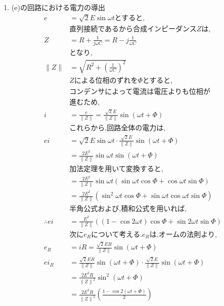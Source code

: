\documentclass[twocolumn]{article}
\begin{document}
\begin{enumerate}
    \item (e)の回路における電力の導出
    \begin{align*}
      e &= \sqrt{2}E\sin\omega t \text{とすると,}\\
      &\text{直列接続であるから合成インピーダンス}Z\text{は,}\\
      Z &= R + \frac{1}{j\omega C} = R -j\frac{1}{\omega C}\\
      &\text{となり,}\\
      \|Z\| &= \sqrt{R^2 + {\left( \frac{1}{\omega C} \right)}^2}\\
      &Z\text{による位相のずれを}\Phi\text{とすると,}\\
      &\text{コンデンサによって電流は電圧よりも位相が}\\
      &\text{進むため,}\\
      i &= \frac{e}{\|Z\|} = \frac{\sqrt{2}E}{\|Z\|}\sin\left(\omega t + \Phi\right)\\
      &\text{これらから,回路全体の電力は,}\\
      ei  &= \sqrt{2}E\sin\omega t \cdot \frac{\sqrt{2}E}{\|Z\|}\sin\left(\omega t + \Phi\right)\\
          &= \frac{2E^2}{\|Z\|}\sin\omega t\sin\left(\omega t + \Phi\right)\\
      &\text{加法定理を用いて変換すると,}\\
          &= \frac{2E^2}{\|Z\|}\sin\omega t\left(\sin\omega t \cos \Phi + \cos\omega t \sin \Phi\right)\\
          &= \frac{2E^2}{\|Z\|}\left(\sin^2\omega t \cos \Phi + \sin\omega t\cos\omega t \sin \Phi\right)\\
      &\text{半角公式および,積和公式を用いれば,}\\
\therefore ei  &= \frac{E^2}{\|Z\|}\left(\left(1-\cos2\omega t\right)\cos \Phi + \sin2\omega t \sin \Phi\right)\\
      &\text{次に}e_R\text{について考える.}e_R\text{は,オームの法則より,}\\
      e_R &= iR = \frac{\sqrt{2}ER}{\|Z\|}\sin\left(\omega t + \Phi\right)\\
      ei_R&= \frac{\sqrt{2}ER}{\|Z\|}\sin\left(\omega t + \Phi\right)\cdot \frac{\sqrt{2}E}{\|Z\|}\sin\left(\omega t + \Phi\right)\\
          &= \frac{2E^2R}{{\|Z\|}^2}\sin^2\left(\omega t + \Phi\right)\\
          &= \frac{2E^2R}{{\|Z\|}^2}\left(\frac{1 - \cos2\left(\omega t + \Phi\right)}{2}\right)\\

\end{align*}
\end{enumerate}
\end{document}
